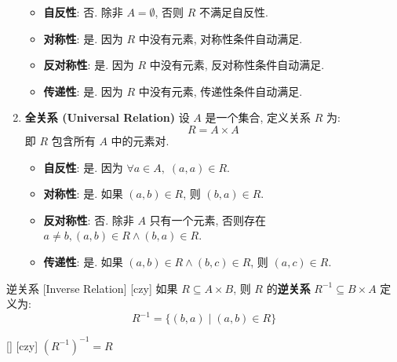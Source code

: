 \documentclass[UTF8]{ctexart}
\begin{document}
\begin{xmp}
\begin{enumerate}
                \begin{itemize}
                    \item \textbf{自反性}: 否. 除非 \( A = \emptyset \), 否则 \( R \) 不满足自反性. 
                    \item \textbf{对称性}: 是. 因为 \( R \) 中没有元素, 对称性条件自动满足. 
                    \item \textbf{反对称性}: 是. 因为 \( R \) 中没有元素, 反对称性条件自动满足. 
                    \item \textbf{传递性}: 是. 因为 \( R \) 中没有元素, 传递性条件自动满足. 
                \end{itemize}
            \item \textbf{全关系 (Universal Relation)}
                设 \( A \) 是一个集合, 定义关系 \( R \) 为: 
                \[
                R = A \times A
                \]
                即 \( R \) 包含所有 \( A \) 中的元素对. 
                
                \begin{itemize}
                    \item \textbf{自反性}: 是. 因为 \( \forall a \in A, \; (a, a) \in R \). 
                    \item \textbf{对称性}: 是. 如果 \( (a, b) \in R \), 则 \( (b, a) \in R \). 
                    \item \textbf{反对称性}: 否. 除非 \( A \) 只有一个元素, 否则存在 \( a \neq b, (a, b) \in R \land (b, a) \in R \). 
                    \item \textbf{传递性}: 是. 如果 \( (a, b) \in R \land (b, c) \in R \), 则 \( (a, c) \in R \). 
                \end{itemize}
            \end{enumerate}
        \end{xmp}
        
        \begin{dfn}
            [UUID]
            {逆关系}
            [Inverse Relation]
            [czy]
            如果 \( R \subseteq A \times B \), 则 \( R \) 的\textbf{逆关系} \( R^{-1} \subseteq B \times A \) 定义为: 
            \[
            R^{-1} = \{ (b, a) \mid (a, b) \in R \}
            \]
        \end{dfn}

        \begin{ppt}
            [UUID]
            {}
            []
            [czy]
            \( (R^{-1})^{-1} = R \)
        \end{ppt}
\end{document}

